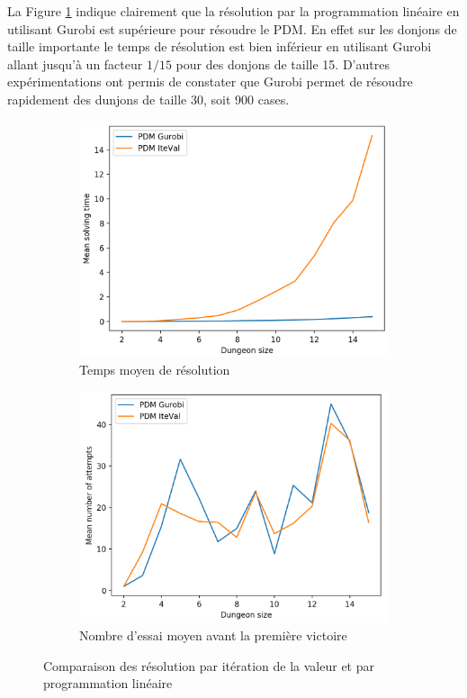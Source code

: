 \documentclass[a4paper]{article}
\theoremstyle{plain}
\begin{document}
La Figure \ref{fig:solveTime} indique clairement que la résolution par la programmation linéaire en utilisant Gurobi est supérieure pour résoudre le PDM. En effet sur les donjons de taille importante le temps de résolution est bien inférieur en utilisant Gurobi allant jusqu'à un facteur $1/15$ pour des donjons de taille 15. D'autres expérimentations ont permis de constater que Gurobi permet de résoudre rapidement des dunjons de taille 30, soit 900 cases.
\begin{figure}
	\centering
	\begin{subfigure}[b]{0.48\textwidth}
		\includegraphics[width=\textwidth]{PlotSolvingTime.png}
		\caption{Temps moyen de résolution}
		\label{fig:solveTime}
	\end{subfigure}
	\begin{subfigure}[b]{0.48\textwidth}
		\includegraphics[width=\textwidth]{PlotNumAttemps.png}
		\caption{Nombre d'essai moyen avant la première victoire}
		\label{fig:numAttempts}
	\end{subfigure}
	\caption{Comparaison des résolution par itération de la valeur et par programmation linéaire}
	\label{fig:comparaisonAlgo}
\end{figure}
\end{document}
